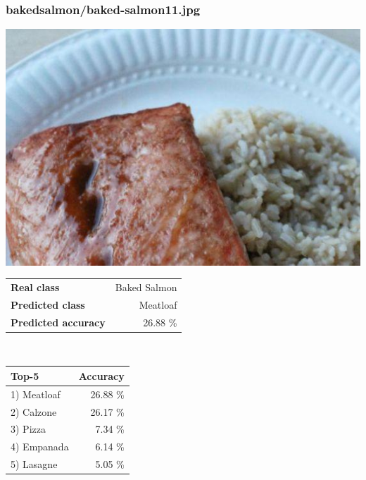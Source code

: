 \subsubsection{baked\textunderscore salmon/baked-salmon11.jpg}

\begin{minipage}[t]{0.4\textwidth}
	\vspace{0pt}
	\includegraphics[width=\linewidth]{images/evaluation-images/baked_salmon/baked-salmon11.jpg}
\end{minipage}
\hfill
\begin{minipage}[t]{0.5\textwidth}
	\vspace{0pt}\raggedright
	\begin{tabularx}{\textwidth}{X r}
		\small \textbf{Real class} & \small Baked Salmon\\
		\small \textbf{Predicted class} & \small Meatloaf\\
		\small \textbf{Predicted accuracy} & \small 26.88 \%
    \end{tabularx}\\
    
    \vspace{6pt}
	\begin{tabularx}{\textwidth}{X r}
        \small \textbf{Top-5} & \small \textbf{Accuracy} \\
        \hline
		\small 1) Meatloaf & \small 26.88 \%\\\small 2) Calzone & \small 26.17 \%\\\small 3) Pizza & \small 7.34 \%\\\small 4) Empanada & \small 6.14 \%\\\small 5) Lasagne & \small 5.05 \%
    \end{tabularx}
\end{minipage}
    
